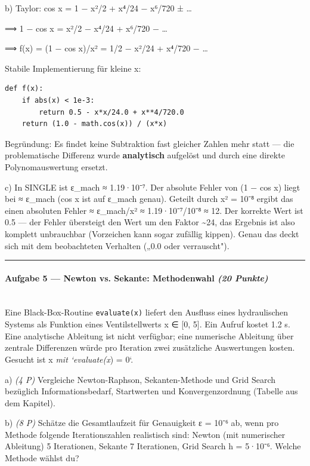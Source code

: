 \documentclass[11pt, a4paper]{article}
\begin{document}
b) Taylor: cos x = 1 − x²/2 + x⁴/24 − x⁶/720 ± …

⟹ 1 − cos x = x²/2 − x⁴/24 + x⁶/720 − …

⟹ f(x) = (1 − cos x)/x² = 1/2 − x²/24 + x⁴/720 − …


Stabile Implementierung für kleine x:

\begin{lstlisting}
def f(x):
    if abs(x) < 1e-3:
        return 0.5 - x*x/24.0 + x**4/720.0
    return (1.0 - math.cos(x)) / (x*x)
\end{lstlisting}

Begründung: Es findet keine Subtraktion fast gleicher Zahlen mehr statt — die problematische Differenz wurde \textbf{analytisch} aufgelöst und durch eine direkte Polynomauswertung ersetzt.


c) In SINGLE ist ε\_mach ≈ 1.19·10⁻⁷. Der absolute Fehler von (1 − cos x) liegt bei ≈ ε\_mach (cos x ist auf ε\_mach genau). Geteilt durch x² = 10⁻⁸ ergibt das einen absoluten Fehler ≈ ε\_mach/x² ≈ 1.19·10⁻⁷/10⁻⁸ ≈ 12. Der korrekte Wert ist 0.5 — der Fehler übersteigt den Wert um den Faktor \textasciitilde{}24, das Ergebnis ist also komplett unbrauchbar (Vorzeichen kann sogar zufällig kippen). Genau das deckt sich mit dem beobachteten Verhalten („0.0 oder verrauscht").



\noindent\textcolor{rulegray}{\rule{\linewidth}{0.4pt}}


\paragraph{Aufgabe 5 — Newton vs. Sekante: Methodenwahl \textit{(20 Punkte)}}\mbox{}\\[2pt]

Eine Black-Box-Routine \texttt{evaluate(x)} liefert den Ausfluss eines hydraulischen Systems als Funktion eines Ventilstellwerts x ∈ [0, 5]. Ein Aufruf kostet 1.2 s. Eine analytische Ableitung ist nicht verfügbar; eine numerische Ableitung über zentrale Differenzen würde pro Iteration zwei zusätzliche Auswertungen kosten. Gesucht ist x\textit{ mit `evaluate(x}) = 0`.


a) \textit{(4 P)} Vergleiche Newton-Raphson, Sekanten-Methode und Grid Search bezüglich Informationsbedarf, Startwerten und Konvergenzordnung (Tabelle aus dem Kapitel).


b) \textit{(8 P)} Schätze die Gesamtlaufzeit für Genauigkeit ε = 10⁻⁶ ab, wenn pro Methode folgende Iterationszahlen realistisch sind: Newton (mit numerischer Ableitung) 5 Iterationen, Sekante 7 Iterationen, Grid Search h = 5·10⁻⁶. Welche Methode wählst du?
\end{document}
